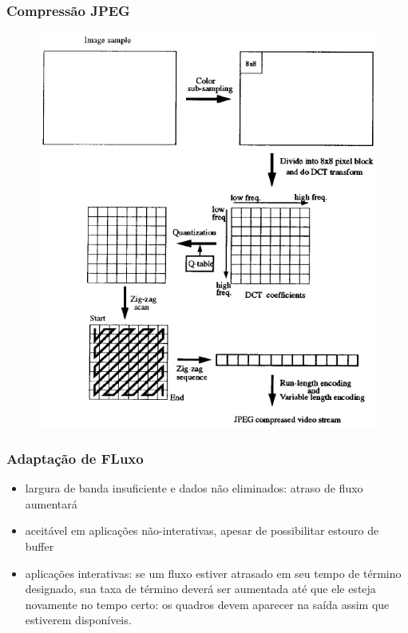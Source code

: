 \documentclass[]{beamer}
\begin{document}
\begin{frame}
 \frametitle{Compressão JPEG}
  \begin{figure}[hbtp]
  \begin{center}
   \includegraphics[scale=0.28]{jpeg_compression.png}
  \end{center}
  \end{figure}
\end{frame}



\begin{frame}
 \frametitle{Adaptação de FLuxo}
 \begin{itemize}
   \item largura de banda insuficiente e dados não eliminados: atraso de fluxo aumentará
   \item aceitável em aplicações não-interativas, apesar de possibilitar estouro de buffer
   \item aplicações interativas: se um fluxo estiver atrasado em seu tempo de término designado,
sua taxa de término deverá ser aumentada até que ele esteja novamente no tempo certo: os quadros
 devem aparecer na saída assim que estiverem disponíveis.
  \end{itemize}
\end{frame}
\end{document}
